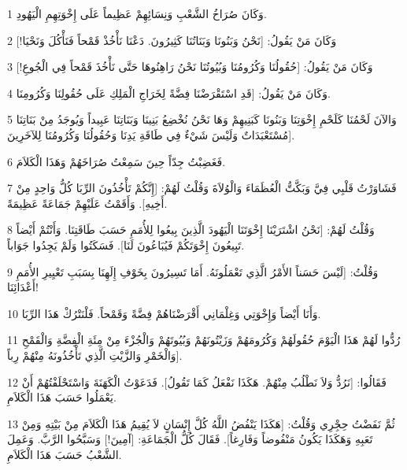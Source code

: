 \par 1 وَكَانَ صُرَاخُ الشَّعْبِ وَنِسَائِهِمْ عَظِيماً عَلَى إِخْوَتِهِمِ الْيَهُودِ.
\par 2 وَكَانَ مَنْ يَقُولُ: [نَحْنُ وَبَنُونَا وَبَنَاتُنَا كَثِيرُونَ. دَعْنَا نَأْخُذْ قَمْحاً فَنَأْكُلَ وَنَحْيَا!]
\par 3 وَكَانَ مَنْ يَقُولُ: [حُقُولُنَا وَكُرُومُنَا وَبُيُوتُنَا نَحْنُ رَاهِنُوهَا حَتَّى نَأْخُذَ قَمْحاً فِي الْجُوعِ!]
\par 4 وَكَانَ مَنْ يَقُولُ: [قَدِ اسْتَقْرَضْنَا فِضَّةً لِخَرَاجِ الْمَلِكِ عَلَى حُقُولِنَا وَكُرُومِنَا.
\par 5 وَالآنَ لَحْمُنَا كَلَحْمِ إِخْوَتِنَا وَبَنُونَا كَبَنِيهِمْ وَهَا نَحْنُ نُخْضِعُ بَنِينَا وَبَنَاتِنَا عَبِيداً وَيُوجَدُ مِنْ بَنَاتِنَا مُسْتَعْبَدَاتٌ وَلَيْسَ شَيْءٌ فِي طَاقَةِ يَدِنَا وَحُقُولُنَا وَكُرُومُنَا لِلآخَرِينَ].
\par 6 فَغَضِبْتُ جِدّاً حِينَ سَمِعْتُ صُرَاخَهُمْ وَهَذَا الْكَلاَمَ.
\par 7 فَشَاوَرْتُ قَلْبِي فِيَّ وَبَكَّتُّ الْعُظَمَاءَ وَالْوُلاَةَ وَقُلْتُ لَهُمْ: [إِنَّكُمْ تَأْخُذُونَ الرِّبَا كُلُّ وَاحِدٍ مِنْ أَخِيهِ]. وَأَقَمْتُ عَلَيْهِمْ جَمَاعَةً عَظِيمَةً.
\par 8 وَقُلْتُ لَهُمْ: [نَحْنُ اشْتَرَيْنَا إِخْوَتَنَا الْيَهُودَ الَّذِينَ بِيعُوا لِلأُمَمِ حَسَبَ طَاقَتِنَا. وَأَنْتُمْ أَيْضاً تَبِيعُونَ إِخْوَتَكُمْ فَيُبَاعُونَ لَنَا]. فَسَكَتُوا وَلَمْ يَجِدُوا جَوَاباً.
\par 9 وَقُلْتُ: [لَيْسَ حَسَناً الأَمْرُ الَّذِي تَعْمَلُونَهُ. أَمَا تَسِيرُونَ بِخَوْفِ إِلَهِنَا بِسَبَبِ تَعْيِيرِ الأُمَمِ أَعْدَائِنَا!
\par 10 وَأَنَا أَيْضاً وَإِخْوَتِي وَغِلْمَانِي أَقْرَضْنَاهُمْ فِضَّةً وَقَمْحاً. فَلْنَتْرُكْ هَذَا الرِّبَا.
\par 11 رُدُّوا لَهُمْ هَذَا الْيَوْمَ حُقُولَهُمْ وَكُرُومَهُمْ وَزَيْتُونَهُمْ وَبُيُوتَهُمْ وَالْجُزْءَ مِنْ مِئَةِ الْفِضَّةِ وَالْقَمْحِ وَالْخَمْرِ وَالزَّيْتِ الَّذِي تَأْخُذُونَهُ مِنْهُمْ رِباً].
\par 12 فَقَالُوا: [نَرُدُّ وَلاَ نَطْلُبُ مِنْهُمْ. هَكَذَا نَفْعَلُ كَمَا تَقُولُ]. فَدَعَوْتُ الْكَهَنَةَ وَاسْتَحْلَفْتُهُمْ أَنْ يَعْمَلُوا حَسَبَ هَذَا الْكَلاَمِ.
\par 13 ثُمَّ نَفَضْتُ حِجِْرِي وَقُلْتُ: [هَكَذَا يَنْفُضُ اللَّهُ كُلَّ إِنْسَانٍ لاَ يُقِيمُ هَذَا الْكَلاَمَ مِنْ بَيْتِهِ وَمِنْ تَعَبِهِ وَهَكَذَا يَكُونُ مَنْفُوضاً وَفَارِغاً]. فَقَالَ كُلُّ الْجَمَاعَةِ: [آمِينَ!] وَسَبَّحُوا الرَّبَّ. وَعَمِلَ الشَّعْبُ حَسَبَ هَذَا الْكَلاَمِ.
